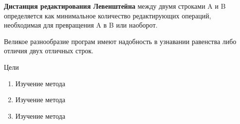 \tableofcontents{}

\Introduction

\textbf{Дистанция редактирования Левенштейна} между двумя строками A и B определяется как минимальное количество редактирующих операций, необходимая для превращения A в B или наоборот. 

Великое разнообразие програм имеют надобность в узнавании равенства либо отличия двух отличных строк.

Цели
\begin{enumerate}[1.]
    \item Изучение метода
    \item Изучение метода
    \item Изучение метода
\end{enumerate}

